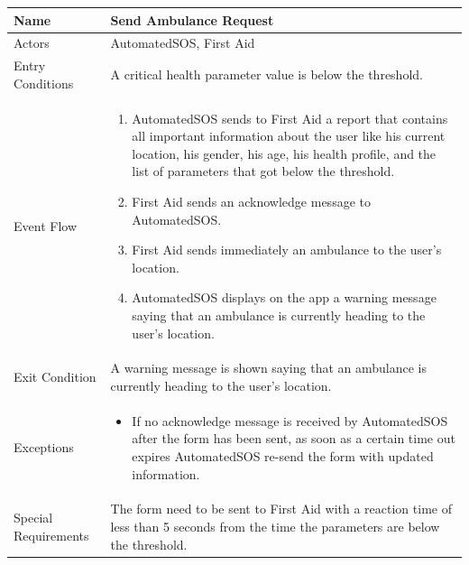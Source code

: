 \begin{enumerate}
\FloatBarrier
\begin{table}[h]
\begin{tabular}{|l|p{}|}
\hline
Name             & Send Ambulance Request \\ \hline
Actors           & AutomatedSOS, First Aid  \\ \hline
Entry Conditions & A critical health parameter value is below the threshold.
\\ \hline
Event Flow       & \begin{enumerate}
            \item AutomatedSOS sends to First Aid a report that contains all important information about the user like his current location, his gender, his age, his health profile, and the list of parameters that got below the threshold.
            \item First Aid sends an acknowledge message to AutomatedSOS.
            \item First Aid sends immediately an ambulance to the user's location.
            \item AutomatedSOS displays on the app a warning message saying that an ambulance is currently heading to the user's location. 
        \end{enumerate}
\\ \hline
Exit Condition   & A warning message is shown saying that an ambulance is currently heading to the user's location.
\\ \hline
Exceptions       & \begin{itemize}
\item If no acknowledge message is received by AutomatedSOS after the form has been sent, as soon as a certain time out expires AutomatedSOS re-send the form with updated information. 
\end{itemize}
\\ \hline
Special Requirements & The form need to be sent to First Aid with a reaction time of less than 5 seconds from the time the parameters are below the threshold.
\\ \hline 
\end{tabular}
\end{table}
\FloatBarrier


\end{enumerate}

